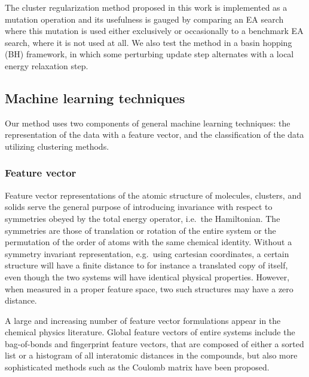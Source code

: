 \documentclass[aip,amsmath,amssymb,reprint]{revtex4-1}
\begin{document}
The cluster regularization method proposed in this work is implemented
as a mutation operation and its usefulness is gauged by comparing an
EA search where this mutation is used either exclusively or
occasionally to a benchmark EA search, where it is not used at all. We
also test the method in a basin hopping (BH) framework,\cite{wales1997} in which some
perturbing update step alternates with a local energy relaxation step.

\subsection{Machine learning techniques}
Our method uses two components of general machine learning techniques:
the representation of the data with a feature vector, and the
classification of the data utilizing clustering methods.

\subsubsection{Feature vector}
Feature vector representations of the atomic structure of molecules,
clusters, and solids serve the general purpose of introducing
invariance with respect to symmetries obeyed by the total energy
operator, i.e.\ the Hamiltonian.\cite{Bartok2013} The symmetries are those of translation
or rotation of the entire system or the permutation of the order of
atoms with the same chemical identity. Without a symmetry invariant
representation, e.g.\ using cartesian coordinates, a certain structure
will have a finite distance to for instance a translated copy of
itself, even though the two systems will have identical physical
properties. However, when measured in a proper feature space, two such
structures may have a zero distance.

A large and increasing number of feature vector formulations appear in
the chemical physics literature. Global feature vectors of entire
systems include the bag-of-bonds\cite{bag_of_bonds} and fingerprint\cite{finger_print} feature
vectors, that are composed of either a sorted list or a histogram of
all interatomic distances in the compounds, but also more
sophisticated methods such as the Coulomb matrix\cite{coulomb_matrix} have been
proposed.
\end{document}
